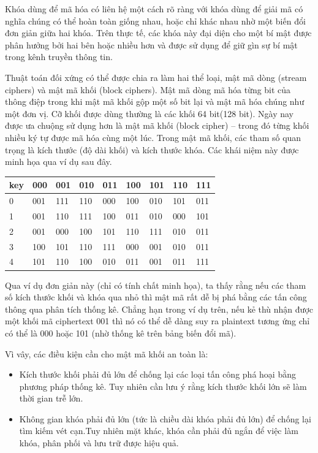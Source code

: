 \documentclass[a4paper,12pt]{report}
\begin{document}
Khóa dùng để mã hóa có liên hệ một cách rõ ràng với khóa dùng để giải mã có nghĩa chúng có thể hoàn toàn giống nhau, hoặc chỉ khác nhau nhờ một biến đổi đơn giản giữa hai khóa. Trên thực tế, các khóa này đại diện cho một bí mật được phân hưởng bởi hai bên hoặc nhiều hơn và được sử dụng để giữ gìn sự bí mật trong kênh truyền thông tin.

Thuật toán đối xứng có thể được chia ra làm hai thể loại, mật mã dòng (stream ciphers) và mật mã khối (block ciphers). Mật mã dòng mã hóa từng bit của thông điệp trong khi mật mã khối gộp một số bit lại và mật mã hóa chúng như một đơn vị. Cỡ khối được dùng thường là các khối 64 bit(128 bit). Ngày nay được ưa chuộng sử dụng hơn là mật mã khối (block cipher) -- trong đó từng khối nhiều ký tự được mã hóa cùng một lúc. Trong mật mã khối, các tham số quan trọng là kích thước (độ dài khối) và kích thước khóa. Các khái niệm này được minh họa qua ví dụ sau đây.
\begin{center}
\begin{tabular}{|l|l|l|l|l|l|l|l|l|}
\hline
key & 000 & 001 & 010 & 011 & 100 & 101 & 110 & 111 \\
\hline
0 & 001 & 111 & 110 & 000 & 100 & 010 & 101 & 011 \\
\hline
1 & 001 & 110 & 111 & 100 & 011 & 010 & 000 & 101 \\
\hline
2 & 001 & 000 & 100 & 101 & 110 & 111 & 010 & 011 \\
\hline
3 & 100 & 101 & 110 & 111 & 000 & 001 & 010 & 011 \\
\hline
4 & 101 & 110 & 100 & 010 & 011 & 001 & 011 & 111 \\
\hline
\end{tabular}
\end{center}

Qua ví dụ đơn giản này (chỉ có tính chất minh họa), ta thấy rằng nếu các
tham số kích thước khối và khóa qua nhỏ thì mật mã rất dễ bị phá bằng các tấn công thông qua phân tích thống kê. Chẳng hạn trong ví dụ trên, nếu kẻ thù nhận được một khối mã ciphertext 001 thì nó có thể dễ dàng suy ra plaintext tương ứng chỉ có thể là 000 hoặc 101 (nhờ thống kê trên bảng biến đổi mã).

Vì vây, các điều kiện cần cho mật mã khối an toàn là:
\begin{itemize}
\item Kích thước khối phải đủ lớn để chống lại các loại tấn công phá hoại bằng phương pháp thống kê. Tuy nhiên cần lưu ý rằng kích thước khối lớn sẽ làm thời gian trễ lớn.
\item Không gian khóa phải đủ lớn (tức là chiều dài khóa phải đủ lớn) để chống lại tìm kiếm vét cạn.Tuy nhiên mặt khác, khóa cần phải đủ ngắn để việc làm khóa, phân phối và lưu trữ được hiệu quả.	
\end{itemize}
\end{document}
